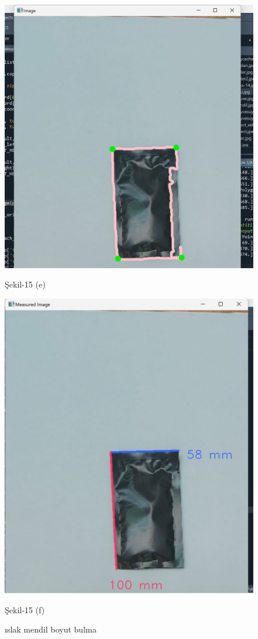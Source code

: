 \documentclass[11pt,a4paper]{report}
\begin{document}
\begin{figure}[!h]
\begin{minipage}[t]{0.470\linewidth}
		\end{minipage}
			\begin{minipage}[t]{0.470\linewidth}
			\centering
			\includegraphics[width=0.65\linewidth]{nesne-2-cerceve}
			\caption*{Şekil-15 (e)}
		\end{minipage}\hfill
		\begin{minipage}[t]{0.470\linewidth}
			\centering
			\includegraphics[width=0.65\linewidth]{boyut-bulma-sonuc-2}
			\caption*{Şekil-15 (f)}
		\end{minipage}
		\caption{ıslak mendil boyut bulma}
	\end{figure}
	\clearpage
	
\end{document}
